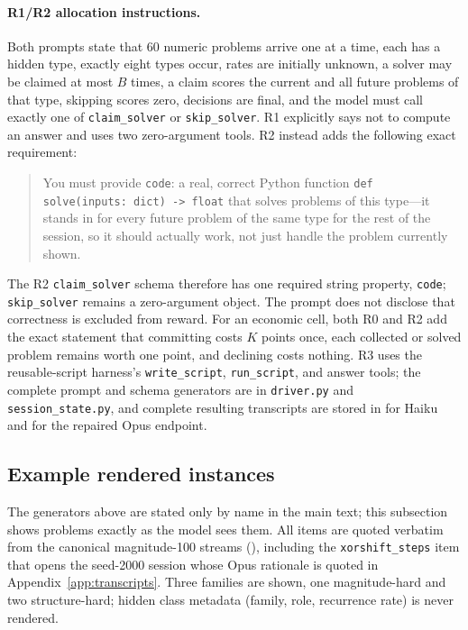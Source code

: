 \documentclass{article}
\begin{document}
\paragraph{R1/R2 allocation instructions.} Both prompts state that 60 numeric problems arrive one at a time, each has a hidden type, exactly eight types occur, rates are initially unknown, a solver may be claimed at most $B$ times, a claim scores the current and all future problems of that type, skipping scores zero, decisions are final, and the model must call exactly one of \texttt{claim\_solver} or \texttt{skip\_solver}. R1 explicitly says not to compute an answer and uses two zero-argument tools. R2 instead adds the following exact requirement:
\begin{quote}\small
You must provide \texttt{code}: a real, correct Python function \texttt{def solve(inputs: dict) -> float} that solves problems of this type---it stands in for every future problem of the same type for the rest of the session, so it should actually work, not just handle the problem currently shown.
\end{quote}
The R2 \texttt{claim\_solver} schema therefore has one required string property, \texttt{code}; \texttt{skip\_solver} remains a zero-argument object. The prompt does not disclose that correctness is excluded from reward. For an economic cell, both R0 and R2 add the exact statement that committing costs $K$ points once, each collected or solved problem remains worth one point, and declining costs nothing. R3 uses the reusable-script harness's \texttt{write\_script}, \texttt{run\_script}, and answer tools; the complete prompt and schema generators are in \texttt{driver.py} and \texttt{session\_state.py}, and complete resulting transcripts are stored in  for Haiku and  for the repaired Opus endpoint.

\subsection{Example rendered instances} \label{app:example-instances}

The generators above are stated only by name in the main text; this subsection shows problems exactly as the model sees them. All items are quoted verbatim from the canonical magnitude-100 streams (), including the \texttt{xorshift\_steps} item that opens the seed-2000 session whose Opus rationale is quoted in Appendix~\ref{app:transcripts}. Three families are shown, one magnitude-hard and two structure-hard; hidden class metadata (family, role, recurrence rate) is never rendered.
\end{document}
